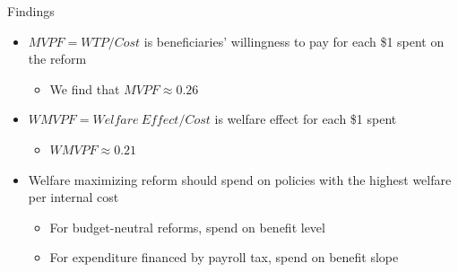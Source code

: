 \begin{frame}[label=findings]{Findings}
\begin{itemize}
    \item $MVPF=WTP/Cost$ is beneficiaries' willingness to pay for each \$1 spent on the reform
    \begin{itemize}
        \item We find that $MVPF \approx 0.26$
    \end{itemize}
    \item $WMVPF=Welfare\ Effect/Cost$ is welfare effect for each \$1 spent
    \begin{itemize}
        \item $WMVPF \approx 0.21$
    \end{itemize}
    \item Welfare maximizing reform should spend on policies with the highest welfare per internal cost
    \begin{itemize}
        \item For budget-neutral reforms, spend on benefit level
        \item For expenditure financed by payroll tax, spend on benefit slope
    \end{itemize}
\end{itemize}

\end{frame}

